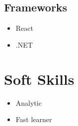 \documentclass[a4paper,10pt]{article}
\begin{document}
\begin{minipage}[t][0.8\textheight]{0.33\textwidth}
    \subsection{Frameworks}
    \begin{itemize}[noitemsep,topsep=0pt]
        \item React
        \item .NET
    \end{itemize}
    \vspace{3mm}
    \section{Soft Skills}
    \begin{itemize}[noitemsep,topsep=0pt]
        \item Analytic
        \item Fast learner
    \end{itemize}
\end{minipage}
\hspace{0.01\textwidth}
\hfill
\end{document}
